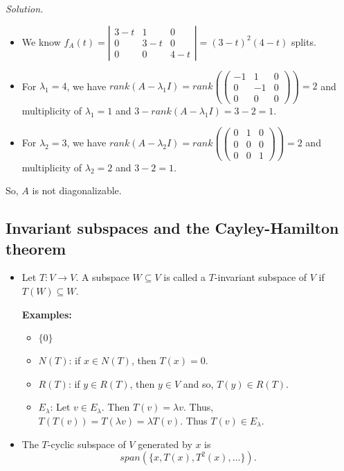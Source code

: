 \documentclass[12pt]{article}
\newenvironment{definition}[2][Definition]{\begin{trivlist}
\item[\hskip \labelsep {\bfseries #1}\hskip \labelsep {\bfseries #2}]}{\end{trivlist}}
\begin{document}
\textit{Solution.}
\begin{itemize}
    \item We know $f_A(t) = \left| \begin{array}{ccc}
     3-t & 1 & 0 \\ 0 & 3-t & 0 \\ 0 & 0 & 4-t
    \end{array} \right| = (3-t)^2(4-t)$ splits.
    
    \item For $\lambda_1 = 4$, we have $rank(A - \lambda_1I) = rank\left( \begin{pmatrix}
    -1 & 1 & 0 \\ 0 & -1 & 0 \\ 0 & 0 & 0
    \end{pmatrix} \right) = 2$ and multiplicity of $\lambda_1 = 1$ and $3 - rank(A - \lambda_1I) = 3 - 2 = 1$. 
    
    \item For $\lambda_2 = 3$, we have $rank(A - \lambda_2I) = rank\left( \begin{pmatrix}
    0 & 1 & 0 \\ 0 & 0 & 0 \\ 0 & 0 & 1
    \end{pmatrix} \right) = 2$ and multiplicity of $\lambda_2 = 2$ and $3 - 2 = 1$. 
\end{itemize}
So, $A$ is not diagonalizable.
 

\setcounter{subsection}{3}

\subsection{Invariant subspaces and the Cayley-Hamilton theorem}

\begin{definition}{6} \text{ }
\begin{itemize}
    \item Let $T : V \to V$. A subspace $W \subseteq V$ is called a $T$-invariant subspace of $V$ if $T(W) \subseteq W$.
    
    \textbf{Examples:}
    \begin{itemize}
        \item $\{0\}$
        
        \item $N(T)$: if $x \in N(T)$, then $T(x) = 0$.
        
        \item $R(T)$: if $y \in R(T)$, then $y \in V$ and so, $T(y) \in R(T)$.
        
        \item $E_\lambda$: Let $v \in E_\lambda$. Then $T(v) = \lambda v$. Thus, $T(T(v)) = T(\lambda v) = \lambda T(v)$. Thus $T(v) \in E_\lambda$.
    \end{itemize}
    
    \item The $T$-cyclic subspace of $V$ generated by $x$ is $$span(\{x, T(x), T^2(x), \dots\}).$$
\end{itemize}
\end{definition}
\end{document}
